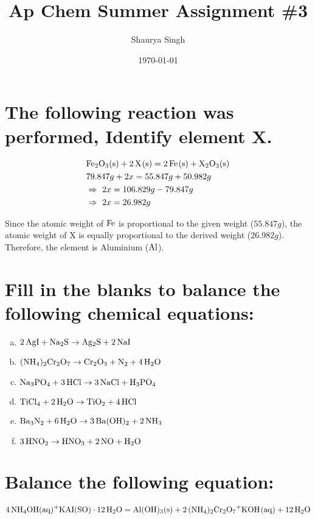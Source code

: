 \documentclass{scrartcl}
\author{Shaurya Singh}
\date{\today}
\title{Ap Chem Summer Assignment \#3}
\begin{document}
\maketitle


\section{The following reaction was performed, Identify element X.}
\label{sec:orge1537a8}
\begin{align*}
  &\ce{Fe2O_3(s)}+\ce{2X(s)} = \ce{2Fe(s) + X_2O_3(s)}\\
  &79.847g+2x=55.847g+50.982g\\
  &\Rightarrow\ 2x=106.829g-79.847g\\
  &\Rightarrow\ 2x=26.982g\\
\end{align*}

Since the atomic weight of \(\ce{Fe}\) is proportional to the given weight
(\(55.847g\)), the atomic weight of X is equally proportional to the derived
weight (\(26.982g\)). Therefore, the element is Aluminium (\(\ce{Al}\)).

\section{Fill in the blanks to balance the following chemical equations:}
\label{sec:orga6ad629}
\begin{enumerate}[a.]
\item \(\ce{2AgI + Na2S} \rightarrow \ce{Ag2S + 2NaI}\)
\item \(\ce{(NH4)2Cr2O7} \rightarrow \ce{Cr2O3}+\ce{N2}+\ce{4H2O}\)
\item \(\ce{Na3PO4}+\ce{3HCl} \rightarrow \ce{3NaCl}+\ce{H3PO4}\)
\item \(\ce{TiCl4}+\ce{2H2O} \rightarrow \ce{TiO2}+\ce{4HCl}\)
\item \(\ce{Ba3N2}+\ce{6H2O} \rightarrow \ce{3Ba(OH)2}+\ce{2NH3}\)
\item \(\ce{3HNO2} \rightarrow \ce{HNO3}+\ce{2NO}+\ce{H2O}\)
\end{enumerate}

\section{Balance the following equation:}
\label{sec:org8cebacf}
\(\ce{4NH4OH(aq)+KAI(SO)} \cdot \ce{12H2O} = \ce{Al(OH)3(s)} +
\ce{2(NH4)2Cr2O7+KOH(aq)}+\ce{12H2O}\)
\end{document}
